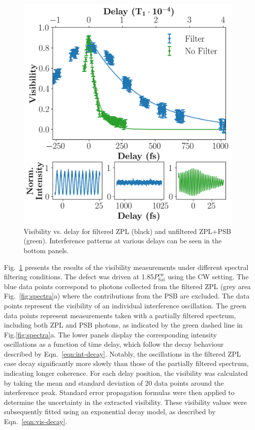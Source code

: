 \begin{figure}[h!]
        \centering
        \includegraphics[width=0.8\linewidth]{Figures/FilterVis.png}
        \caption{Visibility vs. delay for filtered ZPL (black) and unfiltered ZPL+PSB (green). Interference patterns at various delays can be seen in the bottom panels.}
        \label{fig:filter-vis}
\end{figure}

Fig.~\ref{fig:filter-vis} presents the results of the visibility measurements under different spectral filtering conditions. The defect was driven at 1.85$P_{\text{Sat}}^{\text{cw}}$ using the CW setting. The blue data points correspond to photons collected from the filtered ZPL (grey area Fig.~\ref{fig:spectra}a) where the contributions from the PSB are excluded. The data points represent the visibility of an individual interference oscillation. The green data points represent measurements taken with a partially filtered spectrum, including both ZPL and PSB photons, as indicated by the green dashed line in Fig.\ref{fig:spectra}a. The lower panels display the corresponding intensity oscillations as a function of time delay, which follow the decay behaviour described by Eqn.~\ref{eqn:int-decay}. Notably, the oscillations in the filtered ZPL case decay significantly more slowly than those of the partially filtered spectrum, indicating longer coherence. For each delay position, the visibility was calculated by taking the mean and standard deviation of 20 data points around the interference peak. Standard error propagation formulas were then applied to determine the uncertainty in the extracted visibility. These visibility values were subsequently fitted using an exponential decay model, as described by Eqn.~\ref{eqn:vis-decay}. 

